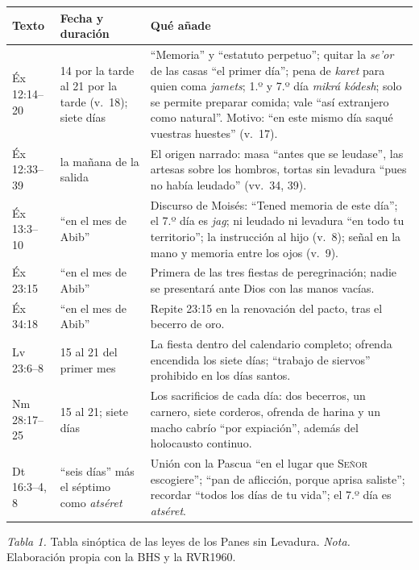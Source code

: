 \documentclass[11pt,letterpaper]{article}
\newcommand{\SENOR}{\textsc{Señor}}
\begin{document}
\begin{center}\begin{minipage}{\linewidth}\centering\small\renewcommand{\arraystretch}{1.2}
\begin{tabular}{@{}L{2.4cm}L{3.6cm}L{9.6cm}@{}}
\toprule
\textbf{Texto} & \textbf{Fecha y duración} & \textbf{Qué añade} \\ \midrule
Éx 12:14--20 & 14 por la tarde al 21 por la tarde (v.~18); siete días & ``Memoria'' y ``estatuto perpetuo''; quitar la \emph{se'or} de las casas ``el primer día''; pena de \emph{karet} para quien coma \emph{jamets}; 1.º y 7.º día \emph{mikrá kódesh}; solo se permite preparar comida; vale ``así extranjero como natural''. Motivo: ``en este mismo día saqué vuestras huestes'' (v.~17). \\
Éx 12:33--39 & la mañana de la salida & El origen narrado: masa ``antes que se leudase'', las artesas sobre los hombros, tortas sin levadura ``pues no había leudado'' (vv.~34, 39). \\
Éx 13:3--10 & ``en el mes de Abib'' & Discurso de Moisés: ``Tened memoria de este día''; el 7.º día es \emph{jag}; ni leudado ni levadura ``en todo tu territorio''; la instrucción al hijo (v.~8); señal en la mano y memoria entre los ojos (v.~9). \\
Éx 23:15 & ``en el mes de Abib'' & Primera de las tres fiestas de peregrinación; nadie se presentará ante Dios con las manos vacías. \\
Éx 34:18 & ``en el mes de Abib'' & Repite 23:15 en la renovación del pacto, tras el becerro de oro. \\
Lv 23:6--8 & 15 al 21 del primer mes & La fiesta dentro del calendario completo; ofrenda encendida los siete días; ``trabajo de siervos'' prohibido en los días santos. \\
Nm 28:17--25 & 15 al 21; siete días & Los sacrificios de cada día: dos becerros, un carnero, siete corderos, ofrenda de harina y un macho cabrío ``por expiación'', además del holocausto continuo. \\
Dt 16:3--4, 8 & ``seis días'' más el séptimo como \emph{atséret} & Unión con la Pascua ``en el lugar que \SENOR{} escogiere''; ``pan de aflicción, porque aprisa saliste''; recordar ``todos los días de tu vida''; el 7.º día es \emph{atséret}. \\
\bottomrule
\end{tabular}\par\nopagebreak
{\footnotesize\color{sepia}\textit{Tabla 1.} Tabla sinóptica de las leyes de los Panes sin Levadura. \textit{Nota.} Elaboración propia con la BHS y la RVR1960.}
\end{minipage}\end{center}
\end{document}
